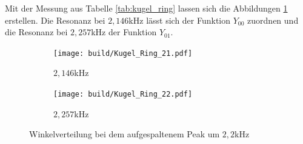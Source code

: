 Mit der Messung aus Tabelle \ref{tab:kugel_ring} lassen sich die Abbildungen \ref{fig:kugel_ring} erstellen.
Die Resonanz bei $2,146$kHz lässt sich der Funktion $Y_{00}$ zuordnen und die Resonanz bei $2,257$kHz  der Funktion $Y_{01}$.
\begin{figure}
  \centering
  \begin{subfigure}{0.4\textwidth}
    \centering
    \texttt{[image: build/Kugel\_Ring\_21.pdf]}
    \caption{$2,146$kHz}
  \end{subfigure}
  \begin{subfigure}{0.4\textwidth}
    \centering
    \texttt{[image: build/Kugel\_Ring\_22.pdf]}
    \caption{$2,257$kHz}
  \end{subfigure}
  \caption{Winkelverteilung bei dem aufgespaltenem Peak um $2,2$kHz}
  \label{fig:kugel_ring}
\end{figure}